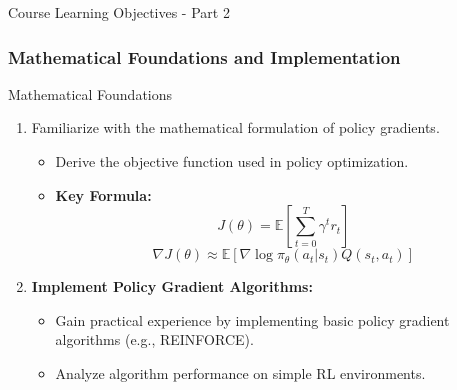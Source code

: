 \documentclass[aspectratio=169]{beamer}
\begin{document}
\begin{frame}[fragile]{Course Learning Objectives - Part 2}
    \frametitle{Mathematical Foundations and Implementation}
    
    \begin{block}{Mathematical Foundations}
        \begin{enumerate}[resume]
            \item Familiarize with the mathematical formulation of policy gradients.
            \begin{itemize}
                \item Derive the objective function used in policy optimization.
                \item \textbf{Key Formula:}
                \begin{equation}
                    J(\theta) = \mathbb{E} \left[ \sum_{t=0}^{T} \gamma^t r_t \right]
                \end{equation}
                \begin{equation}
                    \nabla J(\theta) \approx \mathbb{E} \left[ \nabla \log \pi_\theta(a_t | s_t) Q(s_t, a_t) \right]
                \end{equation}
            \end{itemize}
            \item \textbf{Implement Policy Gradient Algorithms:}
            \begin{itemize}
                \item Gain practical experience by implementing basic policy gradient algorithms (e.g., REINFORCE).
                \item Analyze algorithm performance on simple RL environments.
            \end{itemize}
        \end{enumerate}
    \end{block}
    
\end{frame}
\end{document}
